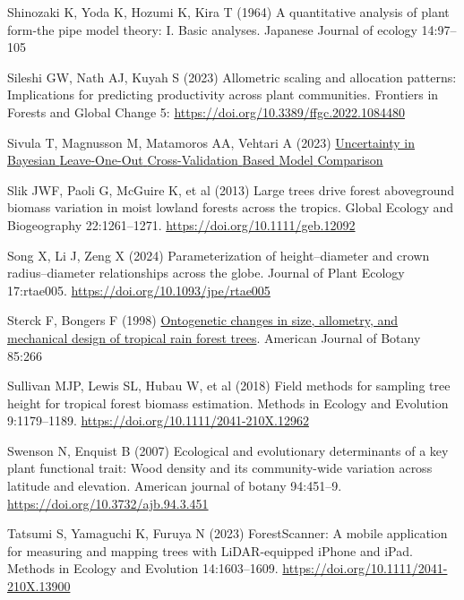 \documentclass[
  12pt,
  letterpaper,
  DIV=11,
  numbers=noendperiod]{scrartcl}
\newlength{\cslhangindent}
\newenvironment{CSLReferences}[2] %
 {\begin{list}{}{%
  \setlength{\itemindent}{0pt}
  \setlength{\leftmargin}{0pt}
  \setlength{\parsep}{0pt}
  \ifodd #1
   \setlength{\leftmargin}{\cslhangindent}
   \setlength{\itemindent}{-1\cslhangindent}
  \fi
  \setlength{\itemsep}{#2\baselineskip}}}
 {\end{list}}
\begin{document}
\begin{CSLReferences}{1}{1}
Shinozaki K, Yoda K, Hozumi K, Kira T (1964) A quantitative analysis of
plant form-the pipe model theory: I. Basic analyses. Japanese Journal of
ecology 14:97--105

Sileshi GW, Nath AJ, Kuyah S (2023) Allometric scaling and allocation
patterns: {Implications} for predicting productivity across plant
communities. Frontiers in Forests and Global Change 5:
\url{https://doi.org/10.3389/ffgc.2022.1084480}

Sivula T, Magnusson M, Matamoros AA, Vehtari A (2023)
\href{https://doi.org/10.48550/arXiv.2008.10296}{Uncertainty in
{Bayesian} {Leave}-{One}-{Out} {Cross}-{Validation} {Based} {Model}
{Comparison}}

Slik JWF, Paoli G, McGuire K, et al (2013) Large trees drive forest
aboveground biomass variation in moist lowland forests across the
tropics. Global Ecology and Biogeography 22:1261--1271.
\url{https://doi.org/10.1111/geb.12092}

Song X, Li J, Zeng X (2024) Parameterization of height--diameter and
crown radius--diameter relationships across the globe. Journal of Plant
Ecology 17:rtae005. \url{https://doi.org/10.1093/jpe/rtae005}

Sterck F, Bongers F (1998)
\href{https://www.ncbi.nlm.nih.gov/pubmed/21684910}{Ontogenetic changes
in size, allometry, and mechanical design of tropical rain forest
trees}. American Journal of Botany 85:266

Sullivan MJP, Lewis SL, Hubau W, et al (2018) Field methods for sampling
tree height for tropical forest biomass estimation. Methods in Ecology
and Evolution 9:1179--1189.
\url{https://doi.org/10.1111/2041-210X.12962}

Swenson N, Enquist B (2007) Ecological and evolutionary determinants of
a key plant functional trait: {Wood} density and its community-wide
variation across latitude and elevation. American journal of botany
94:451--9. \url{https://doi.org/10.3732/ajb.94.3.451}

Tatsumi S, Yamaguchi K, Furuya N (2023) {ForestScanner}: {A} mobile
application for measuring and mapping trees with {LiDAR}-equipped
{iPhone} and {iPad}. Methods in Ecology and Evolution 14:1603--1609.
\url{https://doi.org/10.1111/2041-210X.13900}


\end{CSLReferences}
\end{document}
